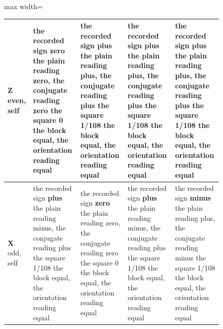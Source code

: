 \begin{chproof}
\begin{figure}[htbp]
{\begin{adjustbox}{max width=\linewidth}
\begin{tabular}{|p{30mm}|p{28mm}|p{28mm}|p{28mm}|p{28mm}|}
\textbf{Z} \newline even, self & the recorded sign \textbf{zero} \newline the plain reading zero, the conjugate reading zero \newline the square 0 \newline the block equal, the orientation reading equal & the recorded sign \textbf{plus} \newline the plain reading plus, the conjugate reading plus \newline the square 1/108 \newline the block equal, the orientation reading equal & the recorded sign \textbf{plus} \newline the plain reading plus, the conjugate reading plus \newline the square 1/108 \newline the block equal, the orientation reading equal & the recorded sign \textbf{plus} \newline the plain reading plus, the conjugate reading plus \newline the square 1/108 \newline the block equal, the orientation reading equal \\ \hline
\textbf{X} \newline odd, self & the recorded sign \textbf{plus} \newline the plain reading minus, the conjugate reading plus \newline the square 1/108 \newline the block equal, the orientation reading equal & the recorded sign \textbf{zero} \newline the plain reading zero, the conjugate reading zero \newline the square 0 \newline the block equal, the orientation reading equal & the recorded sign \textbf{plus} \newline the plain reading minus, the conjugate reading plus \newline the square 1/108 \newline the block equal, the orientation reading equal & the recorded sign \textbf{minus} \newline the plain reading plus, the conjugate reading minus \newline the square 1/108 \newline the block equal, the orientation reading equal \\ \hline

\end{tabular}
\end{adjustbox}}
\end{figure}
\end{chproof}
